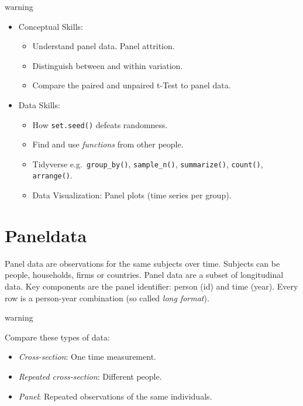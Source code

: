 \documentclass[
]{book}
\providecommand{\tightlist}{%
  \setlength{\itemsep}{0pt}\setlength{\parskip}{0pt}}
\begin{document}
\begin{infobox2}warning

\begin{itemize}
\tightlist
\item
  Conceptual Skills:

  \begin{itemize}
  \tightlist
  \item
    Understand panel data. Panel attrition.
  \item
    Distinguish between and within variation.
  \item
    Compare the paired and unpaired t-Test to panel data.
  \end{itemize}
\item
  Data Skills:

  \begin{itemize}
  \tightlist
  \item
    How \texttt{set.seed()} defeats randomness.\\
  \item
    Find and use \emph{functions} from other people.
  \item
    Tidyverse e.g.~\texttt{group\_by()}, \texttt{sample\_n()}, \texttt{summarize()}, \texttt{count()}, \texttt{arrange()}.
  \item
    Data Visualization: Panel plots (time series per group).
  \end{itemize}
\end{itemize}

\end{infobox2}

\hypertarget{paneldata}{%
\section{Paneldata}\label{paneldata}}

Panel data are observations for the same subjects over time. Subjects can be people, households, firms or countries. Panel data are a subset of longitudinal data. Key components are the panel identifier: person (id) and time (year). Every row is a person-year combination (so called \emph{long format}).

\begin{infobox2}warning

Compare these types of data:

\begin{itemize}
\tightlist
\item
  \emph{Cross-section}: One time measurement.
\item
  \emph{Repeated cross-section}: Different people.
\item
  \emph{Panel}: Repeated observations of the same individuals.
\end{itemize}

\end{infobox2}
\end{document}
